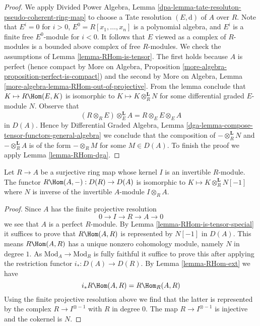 \begin{proof}
We apply Divided Power Algebra, Lemma
\ref{dpa-lemma-tate-resoluton-pseudo-coherent-ring-map}
to choose a Tate resolution $(E, \text{d})$ of $A$ over $R$.
Note that $E^i = 0$ for $i > 0$, $E^0 = R[x_1, \ldots, x_n]$
is a polynomial algebra, and $E^i$ is a finite free $E^0$-module
for $i < 0$. It follows that $E$ viewed as a complex of $R$-modules
is a bounded above complex of free $R$-modules.
We check the assumptions of Lemma \ref{lemma-RHom-is-tensor}.
The first holds because $A$ is perfect
(hence compact by More on Algebra, Proposition
\ref{more-algebra-proposition-perfect-is-compact})
and the second by
More on Algebra, Lemma \ref{more-algebra-lemma-RHom-out-of-projective}.
From the lemma conclude that $K \mapsto R\Hom(E, K)$ is
isomorphic to $K \mapsto K \otimes_R^\mathbf{L} N$ for
some differential graded $E$-module $N$. Observe that
$$
(R \otimes_R E) \otimes_E^\mathbf{L} A = R \otimes_E E \otimes_E A
$$
in $D(A)$. Hence by Differential Graded Algebra, Lemma
\ref{dga-lemma-compose-tensor-functors-general-algebra}
we conclude that the composition of
$- \otimes_R^\mathbf{L} N$ and $- \otimes_R^\mathbf{L} A$
is of the form $- \otimes_R M$ for some $M \in D(A)$.
To finish the proof we apply Lemma \ref{lemma-RHom-dga}.
\end{proof}

\begin{lemma}
\label{lemma-compute-for-effective-Cartier-algebraic}
Let $R \to A$ be a surjective ring map whose kernel $I$
is an invertible $R$-module. The functor
$R\Hom(A, -) : D(R) \to D(A)$
is isomorphic to $K \mapsto K \otimes_R^\mathbf{L} N[-1]$
where $N$ is inverse of the invertible $A$-module $I \otimes_R A$.
\end{lemma}

\begin{proof}
Since $A$ has the finite projective resolution
$$
0 \to I \to R \to A \to 0
$$
we see that $A$ is a perfect $R$-module. By
Lemma \ref{lemma-RHom-is-tensor-special} it suffices
to prove that $R\Hom(A, R)$ is represented by $N[-1]$ in $D(A)$.
This means $R\Hom(A, R)$ has a unique nonzero
cohomology module, namely $N$ in degree $1$. As
$\text{Mod}_A \to \text{Mod}_R$ is fully faithful it suffice to prove
this after applying the restriction functor $i_* : D(A) \to D(R)$.
By Lemma \ref{lemma-RHom-ext} we have
$$
i_*R\Hom(A, R) = R\Hom_R(A, R)
$$
Using the finite projective resolution above we find that the latter
is represented by the complex $R \to I^{\otimes -1}$ with $R$
in degree $0$. The map $R \to I^{\otimes -1}$ is injective
and the cokernel is $N$.
\end{proof}





